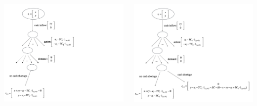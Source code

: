\documentclass{beamer}
\begin{document}
\begin{frame}
\begin{itemize}
\begin{columns}
 {\includegraphics[scale=0.35]{mdp5}}

 {\includegraphics[scale=0.35]{mdp6}}


\end{columns}
\end{itemize}
\end{frame}
\end{document}
